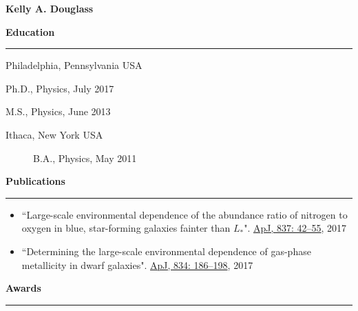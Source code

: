 \newcommand{\sectionrule}{\noindent \hfil\rule{\textwidth}{.6pt}\hfil}

\iffinal{}{\newpage}

\begin{vita}

{\Large\bf Kelly A. Douglass}

\singlespacing


\noindent
{\large\bf {\sc Education}}

\sectionrule
\vspace{1mm}

\begin{description}[noitemsep]
    \item[Drexel University] Philadelphia, Pennsylvania USA
    \begin{description}[noitemsep]
	    \item[] Ph.D., Physics, July 2017
	    \item[] M.S., Physics, June 2013
    \end{description}
    \item[Cornell University] Ithaca, New York USA
    \begin{description}
	    \item[] B.A., Physics, May 2011
    \end{description}
\end{description}



\noindent
{\large\bf {\sc Publications}}

\sectionrule

\begin{itemize} %
	\item ``Large-scale environmental dependence of the abundance ratio of nitrogen to oxygen in blue, star-forming galaxies fainter than $L_*$". \href{https://doi.org/10.3847/1538-4357/aa5e53}{ApJ, 837: 42--55}, 2017
	\item ``Determining the large-scale environmental dependence of gas-phase metallicity in dwarf galaxies". \href{https://doi.org/10.3847/1538-4357/834/2/186}{ApJ, 834: 186--198}, 2017
\end{itemize}



\noindent
{\large\bf {\sc Awards}}

\sectionrule


\end{vita}
